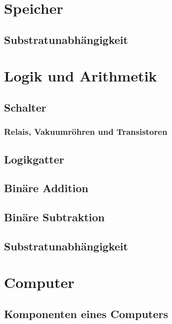 \documentclass[
  letterpaper,
  DIV=11]{scrreprt}
\begin{document}
\chapter{Speicher}\label{speicher}

\section{Substratunabhängigkeit}\label{substratunabhuxe4ngigkeit}

\chapter{Logik und Arithmetik}\label{logik-und-arithmetik}

\section{Schalter}\label{schalter}

\subsection{Relais, Vakuumröhren und
Transistoren}\label{relais-vakuumruxf6hren-und-transistoren}

\section{Logikgatter}\label{logikgatter}

\section{Binäre Addition}\label{binuxe4re-addition}

\section{Binäre Subtraktion}\label{binuxe4re-subtraktion}

\section{Substratunabhängigkeit}\label{substratunabhuxe4ngigkeit-1}

\chapter{Computer}\label{computer}

\section{Komponenten eines Computers}\label{komponenten-eines-computers}
\end{document}

